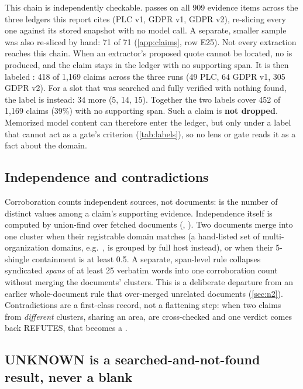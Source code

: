 \evobs{} This chain is independently checkable.  passes on all 909
evidence items across the three ledgers this report cites (PLC v1, GDPR v1, GDPR v2), re-slicing
every one against its stored snapshot with no model call. A separate, smaller sample was also
re-sliced by hand: 71 of 71 (\cref{app:claims}, row E25). Not every extraction reaches this chain.
When an extractor's proposed quote cannot be located, no  is produced, and the claim
stays in the ledger with no supporting span. It is then labeled :
418 of 1{,}169 claims across the three runs (49 PLC, 64 GDPR v1, 305 GDPR v2). For a slot that was
searched and fully verified with nothing found, the label is  instead: 34 more
(5, 14, 15). Together the two labels cover 452 of 1{,}169 claims (39\%) with no supporting span.
Such a claim is \textbf{not dropped}. Memorized model content can therefore enter the ledger, but
only under a label that cannot act as a gate's criterion (\cref{tab:labels}), so no lens or gate
reads it as a fact about the domain.

\subsection{Independence and contradictions}

Corroboration counts independent sources, not documents:  is the
number of distinct  values among a claim's supporting evidence. \evobs{}
Independence itself is computed by union-find over fetched documents
(, ). Two documents
merge into one cluster when their registrable domain matches (a hand-listed set of
multi-organization domains, e.g.\ , is grouped by full host instead), or when
their 5-shingle containment is at least 0.5. A separate, span-level rule collapses syndicated
\emph{spans} of at least 25 verbatim words into one corroboration count without merging the
documents' clusters. This is a deliberate departure from an earlier whole-document rule that
over-merged unrelated documents (\cref{sec:n2}). Contradictions are a first-class  record, not a
flattening step: when two claims from \emph{different} clusters, sharing an area, are cross-checked
and one verdict comes back REFUTES, that becomes a .

\subsection{UNKNOWN is a searched-and-not-found result, never a blank}

